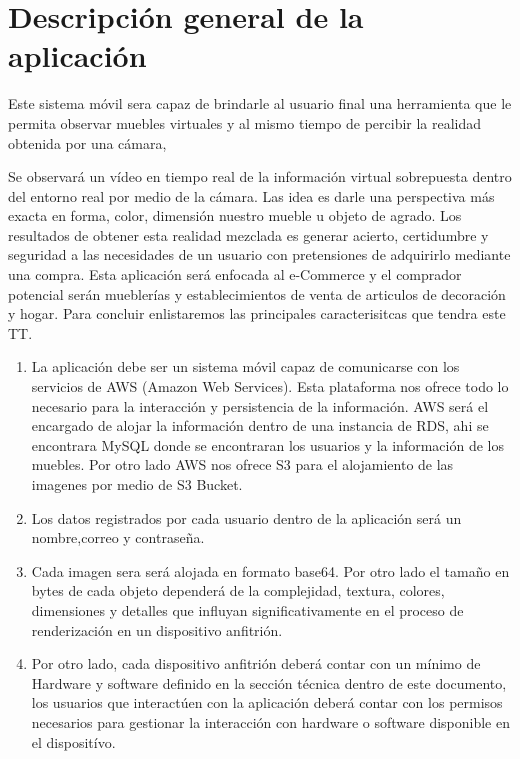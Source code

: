 \section{Descripción general de la aplicación}
Este sistema móvil sera capaz de  brindarle al usuario final una herramienta que le permita observar muebles virtuales y al mismo tiempo de percibir la realidad obtenida por una cámara,\par

Se observará un vídeo en tiempo real de la información virtual sobrepuesta dentro del entorno real por medio de la cámara. Las idea es darle una perspectiva más exacta en forma, color, dimensión nuestro mueble u objeto de agrado. Los resultados de obtener esta realidad mezclada es generar acierto, certidumbre y seguridad a las necesidades de un usuario con pretensiones de adquirirlo mediante una compra. Esta aplicación será enfocada al e-Commerce y el comprador potencial serán mueblerías y establecimientos de venta de articulos de decoración y hogar. Para concluir enlistaremos las principales caracterisitcas que tendra este TT.\par
\begin{enumerate}[1.]
	\item La aplicación debe ser un sistema móvil capaz de comunicarse con los servicios de AWS (Amazon Web Services). Esta plataforma nos ofrece todo lo necesario para la interacción y persistencia de la información. AWS será el encargado de alojar la información dentro de una instancia de RDS, ahi se encontrara MySQL donde se encontraran los usuarios y la información de los muebles. Por otro lado AWS nos ofrece S3 para el alojamiento de las imagenes por medio de S3 Bucket. 
	\item Los datos registrados por cada usuario dentro de la aplicación será un nombre,correo y contraseña.\par
	\item Cada imagen sera será alojada en formato base64. Por otro lado el tamaño en bytes de cada objeto dependerá de la complejidad, textura, colores, dimensiones y detalles que influyan significativamente en el proceso de renderización en un dispositivo anfitrión.\par
	\item Por otro lado, cada dispositivo anfitrión deberá contar con un mínimo de Hardware y software definido en la sección técnica dentro de este documento, los usuarios que interactúen con la aplicación deberá contar con los permisos necesarios para gestionar  la interacción con hardware o software disponible en el dispositívo.\par	
\end{enumerate}
